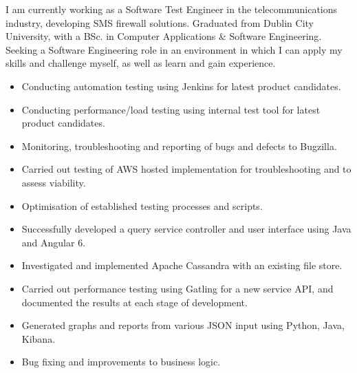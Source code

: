 \documentclass[8pt,a4paper,ragged2e, normalphoto]{altacv-dean}
\begin{document}

\begin{fullwidth}
\makecvheader

\begin{flushleft}
    I am currently working as a Software Test Engineer in the telecommunications industry, developing SMS firewall solutions. 
    Graduated from Dublin City University, with a BSc. in Computer Applications \& Software Engineering. Seeking a Software Engineering role in an environment in which I can apply my skills and challenge myself, as well as learn and gain experience.
\end{flushleft}


    \divider

    \begin{itemize}
        \item Conducting automation testing using Jenkins for latest product candidates.
        \item Conducting performance/load testing using internal test tool for latest product candidates.
        \item Monitoring, troubleshooting and reporting of bugs and defects to Bugzilla.
        \item Carried out testing of AWS hosted implementation for troubleshooting and to assess viability. 
        \item Optimisation of established testing processes and scripts.
    \end{itemize}
    \divider
    
    \begin{itemize}
        \item Successfully developed a query service controller and user interface using Java and Angular 6.
        \item Investigated and implemented Apache Cassandra with an existing file store.
        \item Carried out performance testing using Gatling for a new service API, and documented the results at each stage of development.
        \item Generated graphs and reports from various JSON input using Python, Java, Kibana.
        \item Bug fixing and improvements to business logic.
    \end{itemize}
    \divider

\end{fullwidth}
\end{document}
